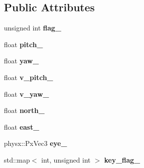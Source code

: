 \subsection*{\-Public \-Attributes}
\begin{DoxyCompactItemize}
\item 
\hypertarget{classneb_1_1camera_1_1camera_a9e2f60405bd7ac4f545196a16f49248f}{unsigned int {\bfseries flag\-\_\-}}\label{classneb_1_1camera_1_1camera_a9e2f60405bd7ac4f545196a16f49248f}

\item 
\hypertarget{classneb_1_1camera_1_1camera_a6961799cec174db6f09db93e4cd57514}{float {\bfseries pitch\-\_\-}}\label{classneb_1_1camera_1_1camera_a6961799cec174db6f09db93e4cd57514}

\item 
\hypertarget{classneb_1_1camera_1_1camera_a49fcdd4dfcac098554f1e70300597f45}{float {\bfseries yaw\-\_\-}}\label{classneb_1_1camera_1_1camera_a49fcdd4dfcac098554f1e70300597f45}

\item 
\hypertarget{classneb_1_1camera_1_1camera_a8b2bfee119dd3382c7b1c66d98de8c2d}{float {\bfseries v\-\_\-pitch\-\_\-}}\label{classneb_1_1camera_1_1camera_a8b2bfee119dd3382c7b1c66d98de8c2d}

\item 
\hypertarget{classneb_1_1camera_1_1camera_a597b1b95796731171e31dd16b2ce3ab7}{float {\bfseries v\-\_\-yaw\-\_\-}}\label{classneb_1_1camera_1_1camera_a597b1b95796731171e31dd16b2ce3ab7}

\item 
\hypertarget{classneb_1_1camera_1_1camera_a73b09ca879ff37ccaff0bd0727e4c5c0}{float {\bfseries north\-\_\-}}\label{classneb_1_1camera_1_1camera_a73b09ca879ff37ccaff0bd0727e4c5c0}

\item 
\hypertarget{classneb_1_1camera_1_1camera_a0b8c198df9a31cdb49bf40f8bbdac9f7}{float {\bfseries east\-\_\-}}\label{classneb_1_1camera_1_1camera_a0b8c198df9a31cdb49bf40f8bbdac9f7}

\item 
\hypertarget{classneb_1_1camera_1_1camera_a1bf63c02c19369185c8218328278bc7e}{physx\-::\-Px\-Vec3 {\bfseries eye\-\_\-}}\label{classneb_1_1camera_1_1camera_a1bf63c02c19369185c8218328278bc7e}

\item 
\hypertarget{classneb_1_1camera_1_1camera_a9003568b1eb646d97fbb05516352c438}{std\-::map$<$ int, unsigned int $>$ {\bfseries key\-\_\-flag\-\_\-}}\label{classneb_1_1camera_1_1camera_a9003568b1eb646d97fbb05516352c438}


\end{DoxyCompactItemize}
